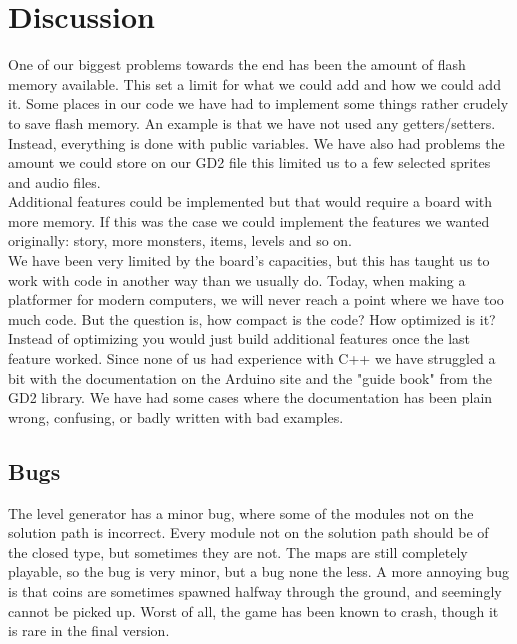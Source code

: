 \chapter{Discussion}
One of our biggest problems towards the end has been the amount of flash memory available. This set a limit for what we could add and how we could add it. Some places in our code we have had to implement some things rather crudely to save flash memory. An example is that we have not used any getters/setters. Instead, everything is done with public variables. We have also had problems the amount we could store on our GD2 file this limited us to a few selected sprites and audio files.
\\
Additional features could be implemented but that would require a board with more memory. If this was the case we could implement the features we wanted originally: story, more monsters, items, levels and so on.\\
We have been very limited by the board's capacities, but this has taught us to work with code in another way than we usually do. Today, when making a platformer for modern computers, we will never reach a point where we have too much code. But the question is, how compact is the code? How optimized is it? Instead of optimizing you would just build additional features once the last feature worked. Since none of us had experience with C++ we have struggled a bit with the documentation on the Arduino site and the "guide book" from the GD2 library. We have had some cases where the documentation has been plain wrong, confusing, or badly written with bad examples.


\section{Bugs} %
The level generator has a minor bug, where some of the modules not on the solution path is incorrect. Every module not on the solution path should be of the closed type, but sometimes they are not. The maps are still completely playable, so the bug is very minor, but a bug none the less.
\newline
A more annoying bug is that coins are sometimes spawned halfway through the ground, and seemingly cannot be picked up.
\newline
Worst of all, the game has been known to crash, though it is rare in the final version.

